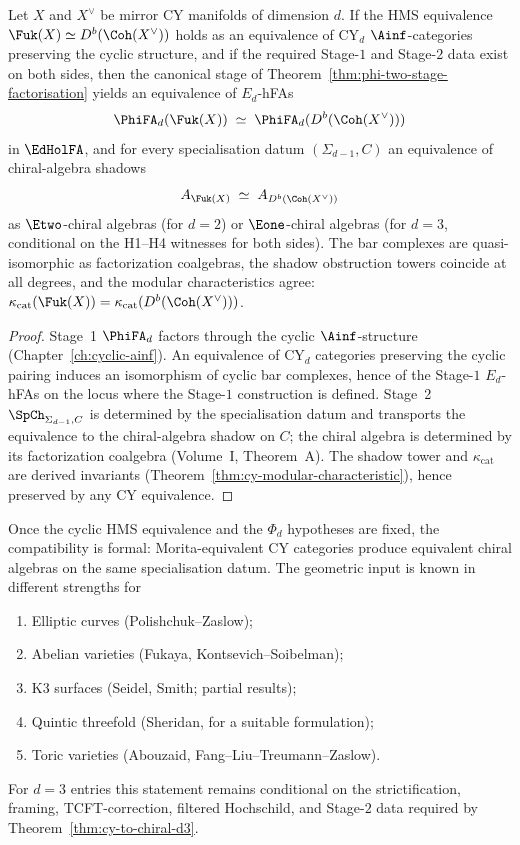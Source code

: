 \begin{proposition}
\label{prop:hms-compatibility}
Let $X$ and $X^\vee$ be mirror CY manifolds of dimension $d$.
If the HMS equivalence $\Fuk(X) \simeq D^b(\Coh(X^\vee))$ holds as
an equivalence of CY$_d$ $\Ainf$-categories preserving the cyclic
structure, and if the required Stage-$1$ and Stage-$2$ data exist on
both sides, then the canonical stage of
Theorem~\ref{thm:phi-two-stage-factorisation} yields an equivalence
of $E_d$-hFAs
\[
 \PhiFA_d(\Fuk(X)) \;\simeq\; \PhiFA_d(D^b(\Coh(X^\vee)))
\]
in $\EdHolFA$, and for every specialisation datum
$(\Sigma_{d-1}, C)$ an equivalence of chiral-algebra shadows
\[
 A_{\Fuk(X)} \;\simeq\; A_{D^b(\Coh(X^\vee))}
\]
as $\Etwo$-chiral algebras (for $d = 2$) or $\Eone$-chiral algebras
(for $d = 3$, conditional on the H1--H4 witnesses for both sides).
The bar complexes are quasi-isomorphic as factorization
coalgebras, the shadow obstruction towers coincide at all degrees,
and the modular characteristics agree:
$\kappa_{\mathrm{cat}}(\Fuk(X))
 = \kappa_{\mathrm{cat}}(D^b(\Coh(X^\vee)))$.
\end{proposition}

\begin{proof}
Stage~1 $\PhiFA_d$ factors through the cyclic $\Ainf$-structure
(Chapter~\ref{ch:cyclic-ainf}). An equivalence of CY$_d$ categories
preserving the cyclic pairing induces an isomorphism of cyclic bar
complexes, hence of the Stage-$1$ $E_d$-hFAs on the locus where
the Stage-$1$ construction is defined. Stage~2
$\SpCh_{\Sigma_{d-1}, C}$ is determined by the specialisation datum
and transports the equivalence to the chiral-algebra shadow on $C$;
the chiral algebra is determined by its factorization coalgebra
(Volume~I, Theorem~A). The shadow tower and
$\kappa_{\mathrm{cat}}$ are derived invariants
(Theorem~\ref{thm:cy-modular-characteristic}), hence preserved by any
CY equivalence.
\end{proof}

\begin{remark}
\label{rem:hms-status}
Once the cyclic HMS equivalence and the $\Phi_d$ hypotheses are fixed,
the compatibility is formal: Morita-equivalent CY categories produce
equivalent chiral algebras on the same specialisation datum. The
geometric input is known in different strengths for
\begin{enumerate}[label=(\alph*)]
 \item Elliptic curves (Polishchuk--Zaslow);
 \item Abelian varieties (Fukaya, Kontsevich--Soibelman);
 \item K3 surfaces (Seidel, Smith; partial results);
 \item Quintic threefold (Sheridan, for a suitable formulation);
 \item Toric varieties (Abouzaid, Fang--Liu--Treumann--Zaslow).
\end{enumerate}
For $d = 3$ entries this statement remains conditional on the
strictification, framing, TCFT-correction, filtered Hochschild, and
Stage-$2$ data required by Theorem~\ref{thm:cy-to-chiral-d3}.
\end{remark}

